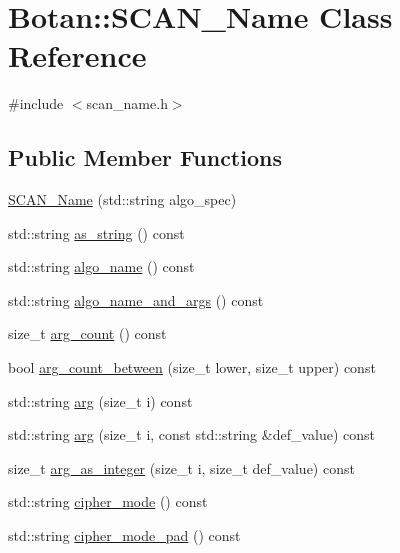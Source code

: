\hypertarget{classBotan_1_1SCAN__Name}{\section{Botan\-:\-:S\-C\-A\-N\-\_\-\-Name Class Reference}
\label{classBotan_1_1SCAN__Name}
}


{\ttfamily \#include $<$scan\-\_\-name.\-h$>$}

\subsection*{Public Member Functions}
\begin{DoxyCompactItemize}
\item 
\hyperlink{classBotan_1_1SCAN__Name_a1fa01f6f943b5cdf54153dda0b321945}{S\-C\-A\-N\-\_\-\-Name} (std\-::string algo\-\_\-spec)
\item 
std\-::string \hyperlink{classBotan_1_1SCAN__Name_a2339553e2a2cb4fabaa21238698fa2a3}{as\-\_\-string} () const 
\item 
std\-::string \hyperlink{classBotan_1_1SCAN__Name_a79d7e5f5b27db8206ebb508f73196d50}{algo\-\_\-name} () const 
\item 
std\-::string \hyperlink{classBotan_1_1SCAN__Name_a639749641dfac234b486cb1ca8d207a5}{algo\-\_\-name\-\_\-and\-\_\-args} () const 
\item 
size\-\_\-t \hyperlink{classBotan_1_1SCAN__Name_a5df0e0ee1efbd1020de2e4f9b6d4f65f}{arg\-\_\-count} () const 
\item 
bool \hyperlink{classBotan_1_1SCAN__Name_a8bf73900c1c580b47d2d35fae3c47d04}{arg\-\_\-count\-\_\-between} (size\-\_\-t lower, size\-\_\-t upper) const 
\item 
std\-::string \hyperlink{classBotan_1_1SCAN__Name_a04f771d767f284f105ec8fd7f3a150d3}{arg} (size\-\_\-t i) const 
\item 
std\-::string \hyperlink{classBotan_1_1SCAN__Name_a1406f350a8874d80aa9378015c923f09}{arg} (size\-\_\-t i, const std\-::string \&def\-\_\-value) const 
\item 
size\-\_\-t \hyperlink{classBotan_1_1SCAN__Name_aa703964f486df9359152c1f040bf8a98}{arg\-\_\-as\-\_\-integer} (size\-\_\-t i, size\-\_\-t def\-\_\-value) const 
\item 
std\-::string \hyperlink{classBotan_1_1SCAN__Name_a54d4a4561de21f4b986603e74d71f06d}{cipher\-\_\-mode} () const 
\item 
std\-::string \hyperlink{classBotan_1_1SCAN__Name_aeb4bad533d67b864b9d7dc5e94f5ea03}{cipher\-\_\-mode\-\_\-pad} () const 
\end{DoxyCompactItemize}



